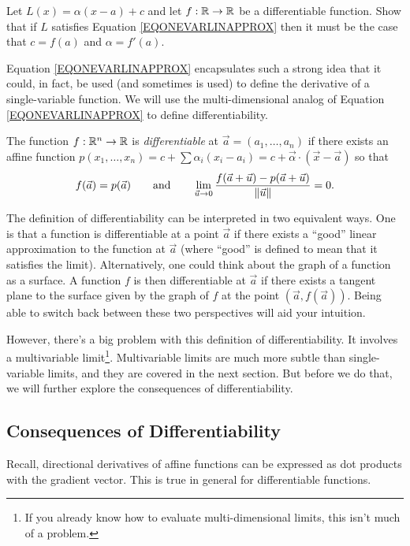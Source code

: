 \begin{exercise}
	Let $L(x)=\alpha(x-a)+c$ and let $f:\mathbb{R}\to\mathbb{R}$ be a differentiable function.
	Show that if $L$ satisfies Equation \eqref{EQONEVARLINAPPROX} then it
	must be the case that $c=f(a)$ and $\alpha=f'(a)$.
\end{exercise}

Equation \eqref{EQONEVARLINAPPROX} encapsulates such a strong idea that
it could, in fact, be used (and sometimes is used) to define the derivative
of a single-variable function.  We will use the multi-dimensional
analog of Equation \eqref{EQONEVARLINAPPROX} to define differentiability.

\begin{definition}[Differentiable]
	The function $f:\mathbb{R}^n\to \mathbb{R}$ is 
	\emph{differentiable}
	at $\vec a=(a_1,\ldots,a_n)$ if there exists
	an affine function $p(x_1,\ldots, x_n)
	= c+\sum \alpha_i (x_i-a_i) = c+\vec \alpha \cdot(\vec x-\vec a)$ so that
	\[
		f(\vec a)=p(\vec a)\qquad\text{and}\qquad\lim_{\vec u\to0} \frac{f(\vec a + \vec u)-p(\vec a + \vec u)}{\lVert\vec u\rVert} = 0.
	\]
\end{definition}

The definition of differentiability can be interpreted in two equivalent
ways.  One is that a function is differentiable at a point $\vec a$ if there exists a ``good''
linear approximation to the function at $\vec a$ (where ``good'' is defined
to mean that it satisfies the limit).  Alternatively, one could think
about the graph of a function as a surface.  A function $f$ is then differentiable
at $\vec a$ if there exists a tangent plane to the surface given by the graph
of $f$ at the point $(\vec a, f(\vec a))$.  Being able to switch back between these
two perspectives will aid your intuition.

However, there's a big problem with this definition of differentiability.  It
involves a multivariable limit\footnote{ If you already know how to evaluate
multi-dimensional limits, this isn't much of a problem.}.  Multivariable limits
are much more subtle than single-variable limits, and they are covered in the next
section.  But before we do that, we will further explore the consequences of 
differentiability.

\subsection{Consequences of Differentiability}

Recall, directional derivatives of affine functions can be expressed
as dot products with the gradient vector.  This is true in general
for differentiable functions.

